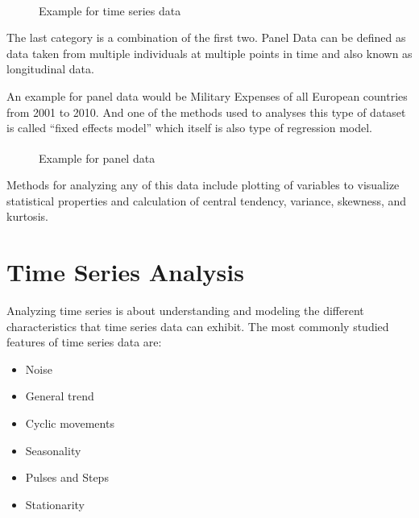 \begin{figure}[ht]
	\centering
	\caption{Example for time series data \textsuperscript{\cite{-1}}}
\end{figure}

The last category is a combination of the first two. Panel Data can be defined as data taken from multiple individuals at multiple points in time and also known as longitudinal data.

An example for panel data would be Military Expenses of all European countries from 2001 to 2010. And one of the methods used to analyses this type of dataset is called “fixed effects model” which itself is also type of regression model.

\begin{figure}[ht]
	\centering
	\caption{Example for panel data \textsuperscript{\cite{-1}}}
\end{figure}

Methods for analyzing any of this data include plotting of variables to visualize statistical properties and calculation of central tendency, variance, skewness, and kurtosis. 

\section{Time Series Analysis}

Analyzing time series is about understanding and modeling the different characteristics that time series data can exhibit. The most commonly studied features of time series data are:
\begin{itemize}
	\item Noise
	\item General trend
	\item Cyclic movements
	\item Seasonality
	\item Pulses and Steps
	\item Stationarity
\end{itemize}

